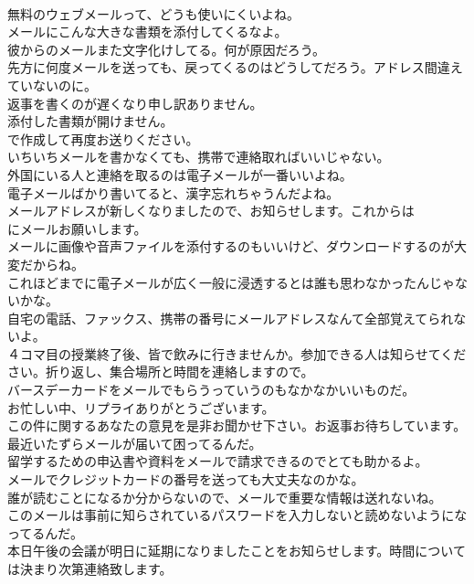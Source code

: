\documentclass[8pt]{extreport}
\begin{document}
\begin{CJK}{UTF8}{min}
\\	無料のウェブメールって、どうも使いにくいよね。	
\\	メールにこんな大きな書類を添付してくるなよ。	
\\	彼からのメールまた文字化けしてる。何が原因だろう。	
\\	先方に何度メールを送っても、戻ってくるのはどうしてだろう。アドレス間違えていないのに。	
\\	返事を書くのが遅くなり申し訳ありません。	
\\	添付した書類が開けません。
\\	で作成して再度お送りください。	
\\	いちいちメールを書かなくても、携帯で連絡取ればいいじゃない。	
\\	外国にいる人と連絡を取るのは電子メールが一番いいよね。	
\\	電子メールばかり書いてると、漢字忘れちゃうんだよね。	
\\	メールアドレスが新しくなりましたので、お知らせします。これからは
\\	にメールお願いします。	
\\	メールに画像や音声ファイルを添付するのもいいけど、ダウンロードするのが大変だからね。	
\\	これほどまでに電子メールが広く一般に浸透するとは誰も思わなかったんじゃないかな。	
\\	自宅の電話、ファックス、携帯の番号にメールアドレスなんて全部覚えてられないよ。	
\\	４コマ目の授業終了後、皆で飲みに行きませんか。参加できる人は知らせてください。折り返し、集合場所と時間を連絡しますので。	
\\	バースデーカードをメールでもらうっていうのもなかなかいいものだ。	
\\	お忙しい中、リプライありがとうございます。	
\\	この件に関するあなたの意見を是非お聞かせ下さい。お返事お待ちしています。	
\\	最近いたずらメールが届いて困ってるんだ。	
\\	留学するための申込書や資料をメールで請求できるのでとても助かるよ。	
\\	メールでクレジットカードの番号を送っても大丈夫なのかな。	
\\	誰が読むことになるか分からないので、メールで重要な情報は送れないね。	
\\	このメールは事前に知らされているパスワードを入力しないと読めないようになってるんだ。	
\\	本日午後の会議が明日に延期になりましたことをお知らせします。時間については決まり次第連絡致します。	

\end{CJK}
\end{document}
